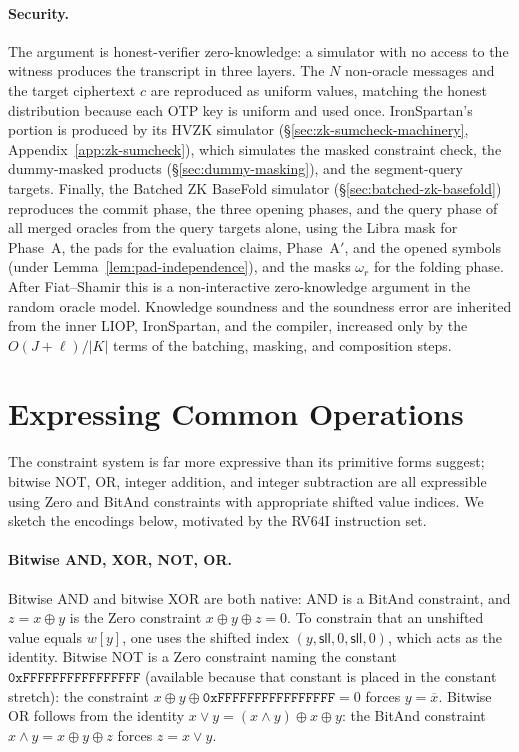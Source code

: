 \documentclass{article}
\theoremstyle{definition}
\begin{document}
\paragraph{Security.}
The argument is honest-verifier zero-knowledge: a simulator with no access to the witness produces the transcript in three layers. The $N$ non-oracle messages and the target ciphertext $c$ are reproduced as uniform values, matching the honest distribution because each OTP key is uniform and used once. IronSpartan's portion is produced by its HVZK simulator (\S\ref{sec:zk-sumcheck-machinery}, Appendix~\ref{app:zk-sumcheck}), which simulates the masked constraint check, the dummy-masked products (\S\ref{sec:dummy-masking}), and the segment-query targets. Finally, the Batched ZK BaseFold simulator (\S\ref{sec:batched-zk-basefold}) reproduces the commit phase, the three opening phases, and the query phase of all merged oracles from the query targets alone, using the Libra mask for Phase~A, the pads for the evaluation claims, Phase~A$'$, and the opened symbols (under Lemma~\ref{lem:pad-independence}), and the masks $\omega_r$ for the folding phase. After Fiat--Shamir this is a non-interactive zero-knowledge argument in the random oracle model. Knowledge soundness and the soundness error are inherited from the inner LIOP, IronSpartan, and the compiler, increased only by the $O(J + \boldsymbol{\ell}) / |K|$ terms of the batching, masking, and composition steps.

\appendix

\section{Expressing Common Operations}
\label{sec:common-ops}

The constraint system is far more expressive than its primitive forms suggest; bitwise NOT, OR, integer addition, and integer subtraction are all expressible using Zero and BitAnd constraints with appropriate shifted value indices. We sketch the encodings below, motivated by the RV64I instruction set.

\paragraph{Bitwise AND, XOR, NOT, OR.}
Bitwise AND and bitwise XOR are both native: AND is a BitAnd constraint, and $z = x \oplus y$ is the Zero constraint $x \oplus y \oplus z = 0$. To constrain that an unshifted value equals $w[y]$, one uses the shifted index $(y, \textsf{sll}, 0, \textsf{sll}, 0)$, which acts as the identity. Bitwise NOT is a Zero constraint naming the constant $\texttt{0xFFFFFFFFFFFFFFFF}$ (available because that constant is placed in the constant stretch): the constraint $x \oplus y \oplus \texttt{0xFFFFFFFFFFFFFFFF} = 0$ forces $y = \overline{x}$. Bitwise OR follows from the identity $x \lor y = (x \land y) \oplus x \oplus y$: the BitAnd constraint $x \land y = x \oplus y \oplus z$ forces $z = x \lor y$.
\end{document}
